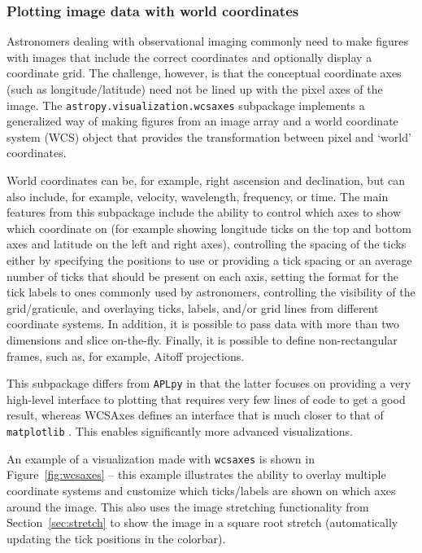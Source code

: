 \documentclass[modern]{aastex61}
\newcommand{\package}[1]{\texttt{#1}\xspace}
\newcommand{\sectionname}{Section\xspace}
\renewcommand{\figurename}{Figure\xspace}
\begin{document}
\subsubsection{Plotting image data with world coordinates}

Astronomers dealing with observational imaging commonly need to make figures with images that include the correct coordinates and optionally display a coordinate grid. The challenge, however, is that the conceptual coordinate axes (such as longitude/latitude) need not be lined up with the pixel axes of the image. The \package{astropy.visualization.wcsaxes} subpackage implements a generalized way of making figures from an image array and a world coordinate system (WCS) object that provides the transformation between pixel and `world' coordinates.

World coordinates can be, for example, right ascension and declination, but can also include, for example, velocity, wavelength, frequency, or time. The main features from this subpackage include the ability to control which axes to show which coordinate on (for example showing longitude ticks on the top and bottom axes and latitude on the left and right axes), controlling the spacing of the ticks either by specifying the positions to use or providing a tick spacing or an average number of ticks that should be present on each axis, setting the format for the tick labels to ones commonly used by astronomers, controlling the visibility of the grid/graticule, and overlaying ticks, labels, and/or grid lines from different coordinate systems. In addition, it is possible to pass data with more than two dimensions and slice on-the-fly. Finally, it is possible to define non-rectangular frames, such as, for example, Aitoff projections.

This subpackage differs from \package{APLpy} \citep{aplpy} in that the latter focuses on providing a very high-level interface to plotting that requires very few lines of code to get a good result, whereas WCSAxes defines an interface that is much closer to that of \package{matplotlib} \citep{matplotlib}. This enables significantly more advanced visualizations.

An example of a visualization made with \package{wcsaxes} is shown in \figurename~\ref{fig:wcsaxes} -- this example illustrates the ability to overlay multiple coordinate systems and customize which ticks/labels are shown on which axes around the image. This also uses the image stretching functionality from \sectionname~\ref{sec:stretch} to show the image in a square root stretch (automatically updating the tick positions in the colorbar).
\end{document}
